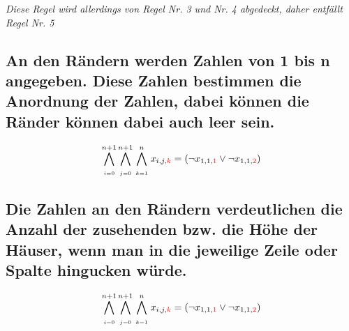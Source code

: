 \documentclass[11pt, a4paper]{article}
\begin{document}
	\textit{Diese Regel wird allerdings von Regel Nr. 3 und Nr. 4 abgedeckt, daher entfällt Regel Nr. 5}
	\bigskip
	
	\subsection{An den Rändern werden Zahlen von 1 bis n angegeben. Diese Zahlen bestimmen die Anordnung der Zahlen, dabei können die Ränder können dabei auch leer sein.}

		\begin{align*}
			\bigwedge_{\atop i=0}^{n+1} \bigwedge_{\atop j=0}^{n+1} \bigwedge_{\atop k=1}^{n}
			x_{i,j,{\color{red} k}} = 
			(\neg x_{1,1,{\color{red} 1}} \vee \neg x_{1,1,{\color{red} 2}})
		\end{align*}
		
	
	\subsection{Die Zahlen an den Rändern verdeutlichen die Anzahl der zusehenden bzw. die Höhe der Häuser, wenn man in die jeweilige Zeile oder Spalte hingucken würde.}
	
	\begin{align*}
		\bigwedge_{\atop i=0}^{n+1} \bigwedge_{\atop j=0}^{n+1} \bigwedge_{\atop k=1}^{n}
		x_{i,j,{\color{red} k}} = 
		(\neg x_{1,1,{\color{red} 1}} \vee \neg x_{1,1,{\color{red} 2}})
	\end{align*}
	
	
	
	
	
	
	
	
	
	
	
	
	
	
	
%	
%	
%	
%	
	
\end{document}
